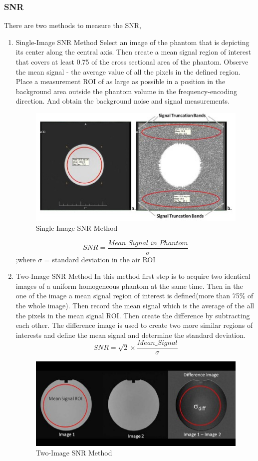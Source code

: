 \documentclass[12pt]{article}
\begin{document}
\subsubsection{SNR}
There are two methods to measure the SNR,
\begin{enumerate}
    \item Single-Image SNR Method\newline
    Select an image of the phantom that is depicting its center along the central axis. Then create a mean signal region of interest that covers at least 0.75 of the cross sectional area of the phantom. Observe the mean signal - the average value of all the pixels in the defined region. Place a measurement ROI of as large as possible in a position in the background area outside the phantom volume in the frequency-encoding direction. And obtain the background noise and signal measurements. 
    \begin{figure}[h!]
        \centering
        \includegraphics[width=0.5\linewidth]{ph7.jpg}
        \caption{\small{Single Image SNR Method}}
        \label{fig:Single Image SNR Method}
    \end{figure}
    \begin{equation*}
        SNR = \frac{Mean\_Signal\_in\_Phantom}{\sigma}
    \end{equation*}
   ;where $\sigma$ = standard deviation in the air ROI   
    
    \item Two-Image SNR Method \newline
    In this method first step is to acquire two identical images of a uniform homogeneous phantom at the same time. Then in the one of the image a mean signal region of interest is defined(more than 75\% of the whole image). Then record the mean signal which is the average of the all the pixels in the mean signal ROI. Then create the difference by subtracting each other. The difference image is used to create two more similar regions of interests and define the mean signal and determine the standard deviation.
    \begin{equation*}
        SNR = \sqrt{2} \times \frac{Mean\_Signal}{\sigma}
    \end{equation*}
    \begin{figure}[h!]
        \centering
        \includegraphics[width=0.5\linewidth]{ph8.jpg}
        \caption{\small{Two-Image SNR Method}}
        \label{fig:Two Image SNR Method}
    \end{figure}
\end{enumerate}
\end{document}

